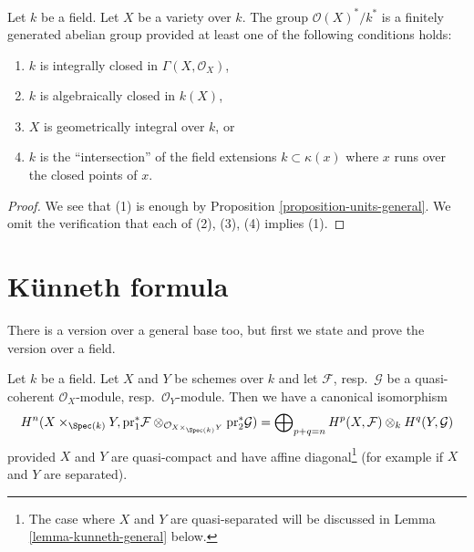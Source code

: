 \begin{lemma}
\label{lemma-units-variety}
Let $k$ be a field.
Let $X$ be a variety over $k$.
The group $\mathcal{O}(X)^*/k^*$ is a finitely generated abelian group
provided at least one of the following conditions holds:
\begin{enumerate}
\item $k$ is integrally closed in $\Gamma(X, \mathcal{O}_X)$,
\item $k$ is algebraically closed in $k(X)$,
\item $X$ is geometrically integral over $k$, or
\item $k$ is the ``intersection'' of the field extensions
$k \subset \kappa(x)$ where $x$ runs over the closed points of $x$.
\end{enumerate}
\end{lemma}

\begin{proof}
We see that (1) is enough by
Proposition \ref{proposition-units-general}.
We omit the verification that each of (2), (3), (4) implies (1).
\end{proof}







\section{K\"unneth formula}
\label{section-kunneth}

\noindent
There is a version over a general base too, but first we state
and prove the version over a field.

\begin{lemma}
\label{lemma-kunneth}
Let $k$ be a field. Let $X$ and $Y$ be schemes over $k$ and
let $\mathcal{F}$, resp.\ $\mathcal{G}$ be a quasi-coherent
$\mathcal{O}_X$-module, resp.\ $\mathcal{O}_Y$-module.
Then we have a canonical isomorphism
$$
H^n(X \times_{\Spec(k)} Y, \text{pr}_1^*\mathcal{F}
\otimes_{\mathcal{O}_{X \times_{\Spec(k)} Y}} \text{pr}_2^*\mathcal{G}) =
\bigoplus\nolimits_{p + q = n}
H^p(X, \mathcal{F}) \otimes_k H^q(Y, \mathcal{G})
$$
provided $X$ and $Y$ are quasi-compact and have affine
diagonal\footnote{The case where $X$ and $Y$ are quasi-separated
will be discussed in Lemma \ref{lemma-kunneth-general} below.}
(for example if $X$ and $Y$ are separated).
\end{lemma}

